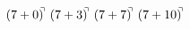 \documentclass[preview]{standalone}
\begin{document}
\begin{align*}
(7+0)^{\hspace{-0.1cm}\urcorner} \ (7+3)^{\hspace{-0.1cm}\urcorner} \ (7+7)^{\hspace{-0.1cm}\urcorner} \ (7+10)^{\hspace{-0.1cm}\urcorner}
\end{align*}
\end{document}
